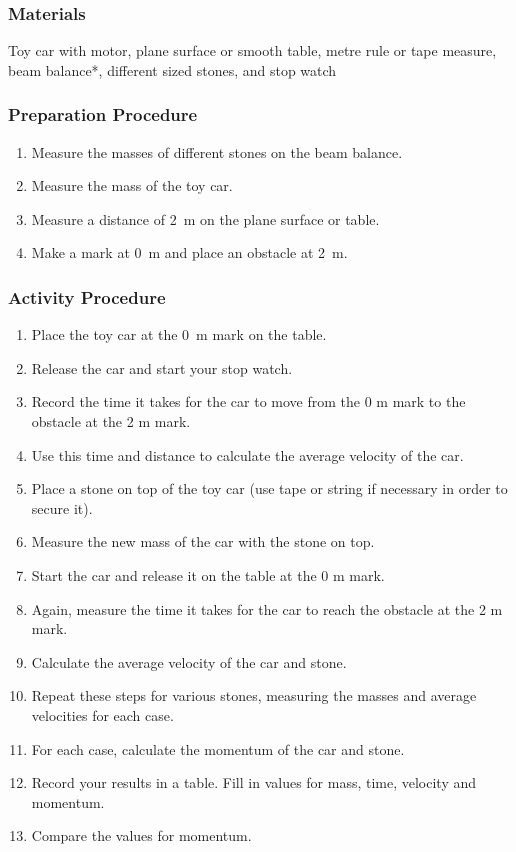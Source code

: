 \subsubsection*{Materials}
Toy car with motor, plane surface or smooth table, metre rule or tape measure, beam balance*, different sized stones, and stop watch

\subsubsection*{Preparation Procedure}
\begin{enumerate}
\item{Measure the masses of different stones on the beam balance.}
\item{Measure the mass of the toy car.}
\item{Measure a distance of 2~m on the plane surface or table.}
\item{Make a mark at 0~m and place an obstacle at 2~m.}
\end{enumerate}

\subsubsection*{Activity Procedure}
\begin{enumerate}
\item{Place the toy car at the 0~m mark on the table.}
\item{Release the car and start your stop watch.}
\item{Record the time it takes for the car to move from the 0 m mark to the obstacle at the 2 m mark.}
\item{Use this time and distance to calculate the average velocity of the car.}
\item{Place a stone on top of the toy car (use tape or string if necessary in order to secure it).}
\item{Measure the new mass of the car with the stone on top.}
\item{Start the car and release it on the table at the 0 m mark.}
\item{Again, measure the time it takes for the car to reach the obstacle at the 2 m mark.}
\item{Calculate the average velocity of the car and stone.}
\item{Repeat these steps for various stones, measuring the masses and average velocities for each case.}
\item{For each case, calculate the momentum of the car and stone.}
\item{Record your results in a table.  Fill in values for mass, time, velocity and momentum.}
\item{Compare the values for momentum.}
\end{enumerate}

